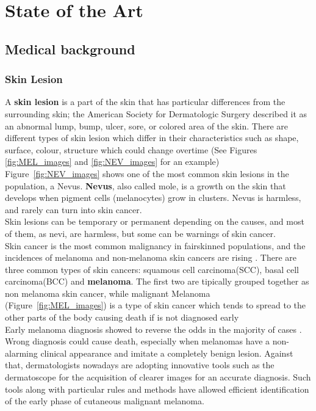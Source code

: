\graphicspath{{chapters/chapter2/}}
\chapter{State of the Art} \label{chapter2}
\section{Medical background}
\label{7ptSection}
\subsection{Skin Lesion}
A \textbf{skin lesion} is a part of the skin that has particular differences from the surrounding skin; the American Society for Dermatologic Surgery described it as an abnormal lump, bump, ulcer, sore, or colored area of the skin.
There are different types of skin lesion which differ in their characteristics such as shape, surface, colour, structure which could change overtime (See Figures \ref{fig:MEL_images} and \ref{fig:NEV_images} for an example) \\
Figure~\ref{fig:NEV_images} shows one of the most common skin lesions in the population, a Nevus. \textbf{Nevus}, also called mole, is a growth on the skin that develops when pigment cells (melanocytes) grow in clusters.  Nevus is harmless, and rarely can turn into skin cancer. \\
Skin lesions can be temporary or permanent depending on the causes, and most of them, as nevi, are harmless, but some can be warnings of skin cancer.\\
Skin cancer is the most common malignancy in fairskinned populations, and the incidences of melanoma and non-melanoma skin cancers are rising \cite{7ptCNNforMel}.
There are three common types of skin cancers: squamous cell carcinoma(SCC), basal cell carcinoma(BCC) and \textbf{melanoma}. The first two are tipically grouped together as non melanoma skin cancer, while malignant Melanoma (Figure~\ref{fig:MEL_images}) is a type of skin cancer which tends to spread to the other parts of the body causing death if is not diagnosed early \cite{7ptCNNforMel}\\
Early melanoma diagnosis showed to reverse the odds in the majority of cases \cite{mtl7ptCoppola}.
Wrong diagnosis  could cause death, especially when melanomas have a non-alarming clinical appearance and imitate a completely benign lesion. Against that, dermatologists nowadays are adopting innovative tools such as the dermatoscope for the acquisition of clearer images for an accurate diagnosis. Such tools along with particular rules and methods have allowed efficient identification of the early phase of cutaneous malignant melanoma.\\

